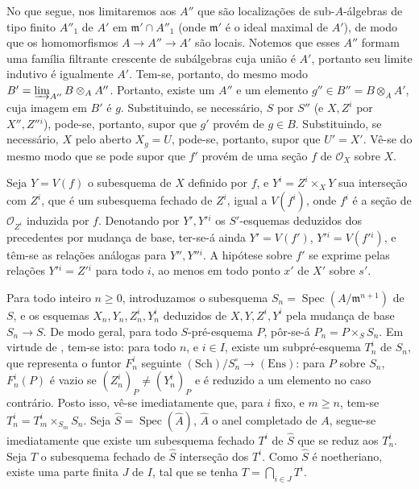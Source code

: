 No que segue, nos limitaremos aos \(A''\) que são localizações de
sub-\(A\)-álgebras de tipo finito \(A''_1\) de \(A'\) em
\(\mathfrak m'\cap A''_1\) (onde \(\mathfrak m'\) é o ideal
maximal de \(A'\)), de modo que os homomorfismos
\(A\to A''\to A'\) são locais. Notemos que esses \(A''\) formam
uma família filtrante crescente de subálgebras cuja união é \(A'\),
portanto seu limite indutivo é igualmente \(A'\). Tem-se, portanto,
do mesmo modo \(B'=\varinjlim_{A''}B\otimes_A A''\). Portanto,
existe um \(A''\) e um elemento \(g''\in B''=B\otimes_A A'\),
cuja imagem em \(B'\) é \(g\). Substituindo, se necessário,
\(S\) por \(S''\) (e \(X,Z^i\) por \(X'',Z''{}^i\)), pode-se,
portanto, supor que \(g'\) provém de \(g\in B\). Substituindo,
se necessário, \(X\) pelo aberto \(X_g=U\), pode-se, portanto,
supor que \(U'=X'\). Vê-se do mesmo modo que se pode supor que
\(f'\) provém de uma seção \(f\) de \(\mathscr O_X\) sobre \(X\).

Seja \(Y=V(f)\) o subesquema de \(X\) definido por \(f\), e
\(Y^i=Z^i\times_X Y\) sua interseção com \(Z^i\), que é um
subesquema fechado de \(Z^i\), igual a \(V(f^i)\), onde \(f^i\)
é a seção de \(\mathscr O_{Z^i}\) induzida por \(f\). Denotando
por \(Y',Y'{}^i\) os \(S'\)-esquemas deduzidos dos precedentes
por mudança de base, ter-se-á ainda
\(Y'=V(f')\),
\(Y'{}^i=V(f'{}^i)\), e têm-se as relações análogas para
\(Y'',Y''{}^i\). A hipótese sobre \(f'\) se exprime pelas
relações \(Y'{}^i=Z'{}^i\) para todo \(i\), ao menos em todo ponto
\(x'\) de \(X'\) sobre \(s'\).

Para todo inteiro \(n\geq0\), introduzamos o subesquema
\(S_n=\operatorname{Spec}(A/\mathfrak m^{n+1})\) de \(S\), e os
esquemas \(X_n,Y_n,Z_n^i,Y_n^i\) deduzidos de \(X,Y,Z^i,Y^i\)
pela mudança de base \(S_n\to S\).
De modo geral, para todo \(S\)-pré-esquema \(P\), pôr-se-á
\(P_n=P\times_S S_n\). Em virtude de
, tem-se isto: para todo
\(n\), e \(i\in I\), existe um subpré-esquema \(T_n^i\) de
\(S_n\), que representa o funtor
\(F_n^i\) seguinte
\((\mathrm{Sch})/S_n^\circ\to(\mathrm{Ens})\): para \(P\) sobre
\(S_n\), \(F_n^i(P)\)
é vazio se \((Z_n^i)_P\ne(Y_n^i)_P\) e é reduzido a um elemento
no caso contrário. Posto isso, vê-se imediatamente que, para \(i\)
fixo, e \(m\geq n\), tem-se \(T_n^i=T_m^i\times_{S_m}S_n\).
Seja \(\widehat S=\operatorname{Spec}(\widehat A)\), \(\widehat A\)
o anel completado de \(A\), segue-se imediatamente que existe um
subesquema fechado \(T^i\) de \(\widehat S\) que se reduz aos
\(T_n^i\). Seja \(T\) o subesquema fechado de \(\widehat S\)
interseção dos \(T^i\). Como \(\widehat S\) é noetheriano, existe
uma parte finita \(J\) de \(I\), tal que se tenha
\(T=\bigcap_{i\in J}T^i\).


